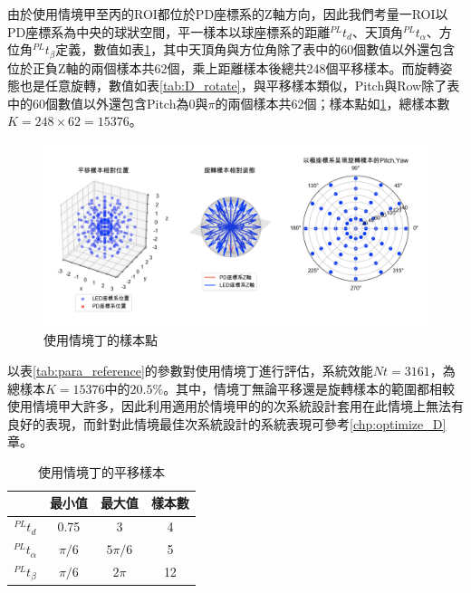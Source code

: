 由於使用情境甲至丙的ROI都位於PD座標系的Z軸方向，因此我們考量一ROI以PD座標系為中央的球狀空間，平一樣本以球座標系的距離$^{PL}t_d$、天頂角$^{PL}t_{\alpha}$、方位角$^{PL}t_{\beta}$定義，數值如表\ref{tab:D_translate}，其中天頂角與方位角除了表中的60個數值以外還包含位於正負Z軸的兩個樣本共62個，乘上距離樣本後總共248個平移樣本。而旋轉姿態也是任意旋轉，數值如表\ref{tab:D_rotate}，與平移樣本類似，Pitch與Row除了表中的60個數值以外還包含Pitch為0與$\pi$的兩個樣本共62個；樣本點如\ref{pic:d_scenario}，總樣本數$K=248 \times 62 = 15376$。

\begin{figure}[htpb]
    \centering
    \includegraphics[width=15cm]{ch4pic/d_scenario.png}
    \caption{使用情境丁的樣本點}
    \label{pic:d_scenario}
\end{figure}

以表\ref{tab:para_reference}的參數對使用情境丁進行評估，系統效能$Nt=3161$，為總樣本$K=15376$中的$20.5\%$。其中，情境丁無論平移還是旋轉樣本的範圍都相較使用情境甲大許多，因此利用適用於情境甲的的次系統設計套用在此情境上無法有良好的表現，而針對此情境最佳次系統設計的系統表現可參考\ref{chp:optimize_D}章。

\begin{table}[htpb]
    \begin{center}
      \caption{使用情境丁的平移樣本}
      \label{tab:D_translate}
      \begin{tabular}{c|c|c|c} %
         & \textbf{最小值} & \textbf{最大值}&\textbf{樣本數}\\
        \hline
        $^{PL}t_d$ & 0.75 &3&4\\
        $^{PL}t_{\alpha}$ & $\pi/6$ & $5\pi/6$ & 5\\
        $^{PL}t_{\beta}$ & $\pi/6$ & $2\pi$ &12\\
      \end{tabular}
    \end{center}
  \end{table}

